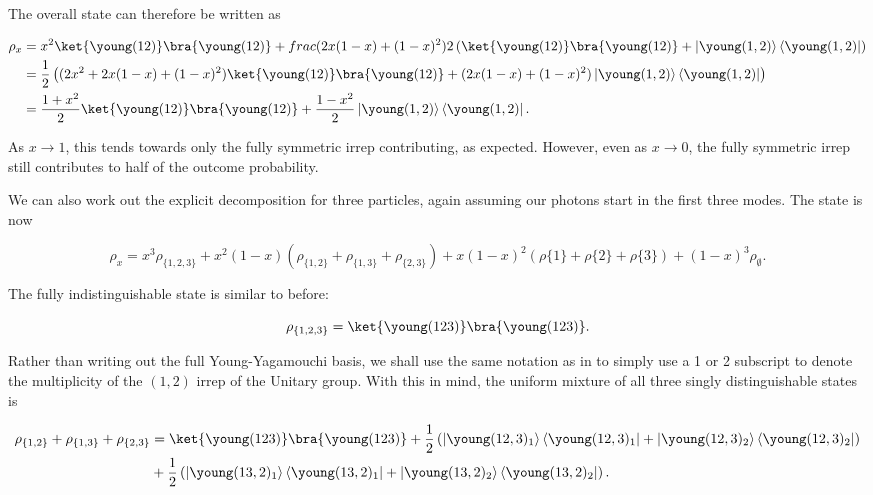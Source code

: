 The overall state can therefore be written as

\begin{align}
\rho_x &= x^2\ket{\young(12)}\bra{\young(12)} + frac{(2x(1-x)+(1-x)^2)}{2}\left(\ket{\young(12)}\bra{\young(12)}+\left|\young(1,2)\right\rangle\left\langle\young(1,2)\right|\right)\\
&= \frac{1}{2}\left((2x^2 + 2x(1-x)+(1-x)^2)\ket{\young(12)}\bra{\young(12)}+(2x(1-x)+(1-x)^2)\left|\young(1,2)\right\rangle\left\langle\young(1,2)\right|\right)\\
&= \frac{1+x^2}{2}\ket{\young(12)}\bra{\young(12)}+\frac{1-x^2}{2}\left|\young(1,2)\right\rangle\left\langle\young(1,2)\right|.
\end{align}

As $x\rightarrow 1$, this tends towards only the fully symmetric irrep contributing, as expected. However, even as $x\rightarrow 0$, the fully symmetric irrep still contributes to half of the outcome probability.

We can also work out the explicit decomposition for three particles, again assuming our photons start in the first three modes. The state is now

\begin{equation}
\rho_x = x^3\rho_{\{1,2,3\}} + x^2(1-x)(\rho_{\{1,2\}}+\rho_{\{1,3\}}+\rho_{\{2,3\}}) + x(1-x)^2(\rho{\{1\}}+\rho{\{2\}}+\rho{\{3\}}) + (1-x)^3\rho_\emptyset.
\end{equation}

The fully indistinguishable state is similar to before:

\begin{equation}
\rho_{\{1,2,3\}} = \ket{\young(123)}\bra{\young(123)}.
\end{equation}

Rather than writing out the full Young-Yagamouchi basis, we shall use the same notation as in \cite{stanisic2018} to simply use a 1 or 2 subscript to denote the multiplicity of the $(1,2)$ irrep of the Unitary group. With this in mind, the uniform mixture of all three singly distinguishable states is

\begin{align}
\rho_{\{1,2\}}+\rho_{\{1,3\}}+\rho_{\{2,3\}} &= \ket{\young(123)}\bra{\young(123)} + \frac{1}{2}\left(\left|\young(12,3)_1\right\rangle\left\langle\young(12,3)_1\right| + \left|\young(12,3)_2\right\rangle\left\langle\young(12,3)_2\right|\right)\nonumber\\
&+ \frac{1}{2}\left(\left|\young(13,2)_1\right\rangle\left\langle\young(13,2)_1\right| + \left|\young(13,2)_2\right\rangle\left\langle\young(13,2)_2\right|\right).
\end{align}

